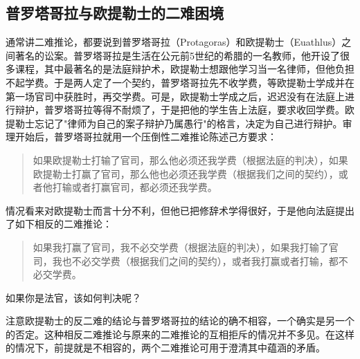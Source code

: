 \subsection{普罗塔哥拉与欧提勒士的二难困境}

通常讲二难推论，都要说到普罗塔哥拉（Protagoras）和欧提勒士（Euathlus）之间著名的讼案。普罗塔哥拉是生活在公元前5世纪的希腊的一名教师，他开设了很多课程，其中最著名的是法庭辩护术，欧提勒士想跟他学习当一名律师，但他负担不起学费。于是两人定了一个契约，普罗塔哥拉先不收学费，等欧提勒士学成并在第一场官司中获胜时，再交学费。可是，欧提勒士学成之后，迟迟没有在法庭上进行辩护，普罗塔哥拉等得不耐烦了，于是把他的学生告上法庭，要求收回学费。欧提勒士忘记了"律师为自己的案子辩护乃属愚行"的格言，决定为自己进行辩护。审理开始后，普罗塔哥拉就用一个压倒性二难推论陈述己方要求：

\begin{quote}
如果欧提勒士打输了官司，那么他必须还我学费（根据法庭的判决），如果欧提勒士打赢了官司，那么他也必须还我学费（根据我们之间的契约），或者他打输或者打赢官司，都必须还我学费。
\end{quote}

情况看来对欧提勒士而言十分不利，但他已把修辞术学得很好，于是他向法庭提出了如下相反的二难推论：

\begin{quote}
如果我打赢了官司，我不必交学费（根据法庭的判决），如果我打输了官司，我也不必交学费（根据我们之间的契约），或者我打赢或者打输，都不必交学费。
\end{quote}

如果你是法官，该如何判决呢？

注意欧提勒士的反二难的结论与普罗塔哥拉的结论的确不相容，一个确实是另一个的否定。这种相反二难推论与原来的二难推论的互相拒斥的情况并不多见。在这样的情况下，前提就是不相容的，两个二难推论可用于澄清其中蕴涵的矛盾。

